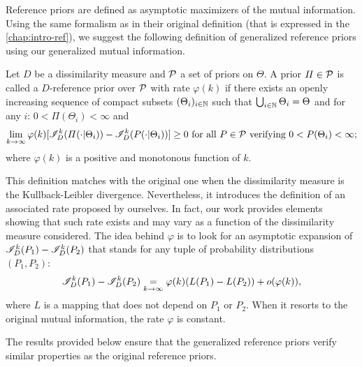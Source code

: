 Reference priors are defined as asymptotic maximizers of the mutual information. Using the same formalism as in their original definition (that is expressed in the \cref{chap:intro-ref}), we suggest the following definition of generalized reference priors using our generalized mutual information.

\begin{defi}\label{def:genref}
    Let $D$ be a dissimilarity measure and $\mathcal{P}$ a set of priors on $\Theta$. A prior $\varPi\in\mathcal{P}$ is called a $D$-reference prior over $\mathcal{P}$ with rate $\varphi(k)$ if there exists an openly increasing  sequence of compact subsets $(\Theta_i)_{i\in\mathbb{N}}$
    such that $\bigcup_{i\in\mathbb{N}}\Theta_i=\Theta$ and for any $i$: $0<\varPi(\Theta_i)<\infty $ and
        \begin{equation}\label{eq:defrefpriorsi}
            \lim_{k\rightarrow\infty}\varphi(k)[\sI^k_D(\varPi(\cdot|\Theta_i))-\sI^k_D(P(\cdot|\Theta_i))] \geq0 \text{\ for all\ } P\in\cP\text{\ verifying\ }0<P(\Theta_i)<\infty;
        \end{equation}
    where  $\varphi(k)$ is a {positive and}  monotonous function of $k$.
\end{defi}


This definition matches with the original one when the dissimilarity measure is the Kullback-Leibler divergence. Nevertheless, it introduces the definition of an associated rate proposed by ourselves. In fact, our
work provides elements showing that such rate exists and may vary as a function of the dissimilarity measure
considered.
The idea behind $\varphi$ is to look for an asymptotic expansion of $\mathscr{I}^k_D(P_1)-\mathscr{I}^k_D(P_2)$ that stands for any tuple of probability distributions $(P_1,P_2)$:
    \begin{equation}
        \mathscr{I}^k_D(P_1)-\mathscr{I}^k_D(P_2) \overset{}{\underset{k\rightarrow\infty}{=}} \varphi(k)(L(P_1)-L(P_2)) + o(\varphi(k)),
    \end{equation}
where $L$ is a mapping that does not depend on $P_1$ or $P_2$.
When it resorts to the original mutual information, the rate $\varphi$ is constant.

The results provided below ensure that the generalized reference priors verify similar properties as the original reference priors.







